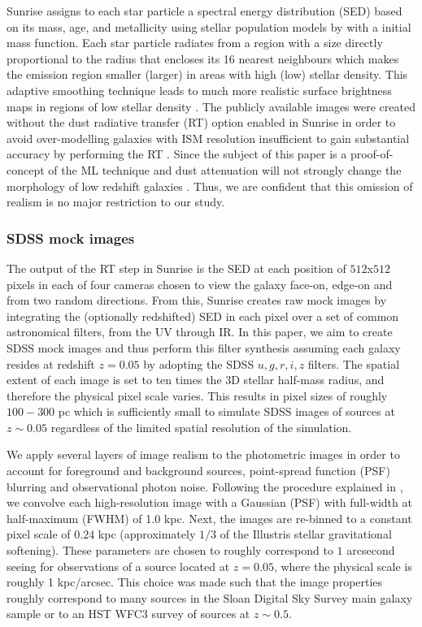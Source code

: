 \documentclass[useAMS,usenatbib]{mnras}
\begin{document}
{\sc Sunrise} assigns to each star particle a spectral energy distribution (SED) based on its mass, age, and metallicity using stellar population models by \citet{Bruzual2003} with a \citet{Chabrier2003} initial mass function. Each star particle radiates from a region with a size directly proportional to the radius that encloses its 16 nearest neighbours which makes the emission region smaller (larger) in areas with high (low) stellar density. This adaptive smoothing technique leads to much more realistic surface brightness maps in regions of low stellar density \citep[see][for full details]{Torrey2015}. The publicly available images were created without the dust radiative transfer (RT) option enabled in {\sc Sunrise} in order to avoid over-modelling galaxies with ISM resolution insufficient to gain substantial accuracy by performing the RT \citep[see][for more details]{Snyder2015}. Since the subject of this paper is a proof-of-concept of the ML technique and dust attenuation will not strongly change the morphology of low redshift galaxies \citep[but see e.g.][for the effect of dust on high redshift star forming galaxies]{Buck2017}. Thus, we are confident that this omission of realism is no major restriction to our study.

\subsubsection{SDSS mock images}
The output of the RT step in {\sc Sunrise} is the SED at each position of $512$x$512$ pixels in each of four cameras chosen to view the galaxy face-on, edge-on and from two random directions. From this, Sunrise creates raw mock images by integrating the (optionally redshifted) SED in each pixel over a set of common astronomical filters, from the UV through IR. In this paper, we aim to create SDSS mock images and thus perform this filter synthesis assuming each galaxy resides at redshift $z=0.05$ by adopting the SDSS $u,g,r,i,z$ filters. The spatial extent of each image is set to ten times the 3D stellar half-mass radius, and therefore the physical pixel scale varies. This results in pixel sizes of roughly $100-300$ pc which is sufficiently small to simulate SDSS images of sources at $z \sim 0.05$ regardless of the limited spatial resolution of the simulation.

We apply several layers of image realism to the photometric images in order to account for foreground and background sources, point-spread function (PSF) blurring and observational photon noise. Following the procedure explained in \citet{Snyder2015}, we convolve each high-resolution image with a Gaussian (PSF) with full-width at half-maximum (FWHM) of 1.0 kpc. Next, the images are re-binned to a constant pixel scale of $0.24$ kpc (approximately $1/3$ of the Illustris stellar gravitational softening). These parameters are chosen to roughly correspond to $1$ arcsecond seeing for observations of a source located at $z = 0.05$, where the physical scale is roughly 1 kpc/arcsec. This choice was made such that the image properties roughly correspond to many sources in the Sloan Digital Sky Survey main galaxy sample \citep{Strauss2002} or to an HST WFC3 survey of sources at $z \sim 0.5$.
\end{document}
